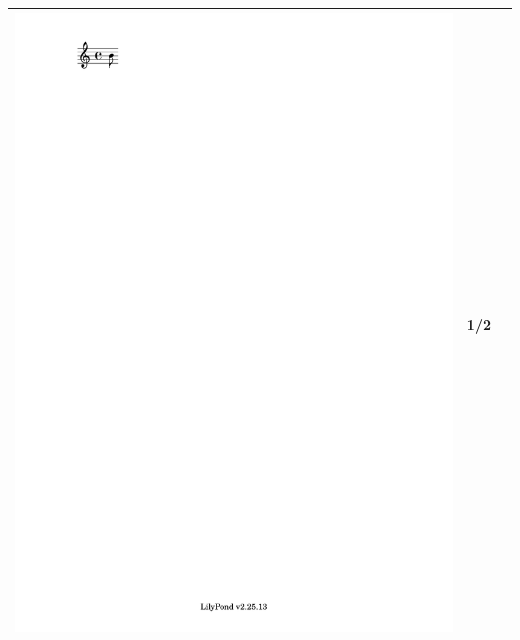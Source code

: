 \documentclass[11pt]{article}
\theoremstyle{definition}
\begin{document}
\begin{table}
\begin{tabular}{|c|c|c|}
\includegraphics[trim=4.29cm 27cm 16cm 1.5cm, clip, scale=1]{eighth_note.pdf} & 1/2 \\
\hline

\end{tabular}
\end{table}
\end{document}
